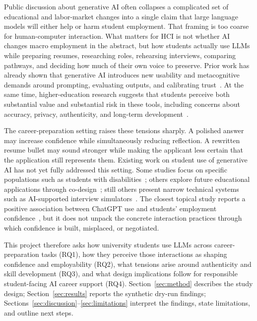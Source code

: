 \documentclass[sigconf,review,anonymous]{acmart}
\begin{document}
Public discussion about generative AI often collapses a complicated set of educational and labor-market changes into a single claim that large language models will either help or harm student employment. That framing is too coarse for human-computer interaction. What matters for HCI is not whether AI changes macro employment in the abstract, but how students actually use LLMs while preparing resumes, researching roles, rehearsing interviews, comparing pathways, and deciding how much of their own voice to preserve. Prior work has already shown that generative AI introduces new usability and metacognitive demands around prompting, evaluating outputs, and calibrating trust~\cite{tankelevitch2024metacognitive}. At the same time, higher-education research suggests that students perceive both substantial value and substantial risk in these tools, including concerns about accuracy, privacy, authenticity, and long-term development~\cite{chan2023studentsvoices,jochim2024teachingtesting}.

The career-preparation setting raises these tensions sharply. A polished answer may increase confidence while simultaneously reducing reflection. A rewritten resume bullet may sound stronger while making the applicant less certain that the application still represents them. Existing work on student use of generative AI has not yet fully addressed this setting. Some studies focus on specific populations such as students with disabilities~\cite{atcheson2025disabilitygenai}; others explore future educational applications through co-design~\cite{prasad2025multimodal}; still others present narrow technical systems such as AI-supported interview simulators~\cite{lee2024vrinterview}. The closest topical study reports a positive association between ChatGPT use and students' employment confidence~\cite{xiao2025employmentconfidence}, but it does not unpack the concrete interaction practices through which confidence is built, misplaced, or negotiated.

This project therefore asks how university students use LLMs across career-preparation tasks (RQ1), how they perceive those interactions as shaping confidence and employability (RQ2), what tensions arise around authenticity and skill development (RQ3), and what design implications follow for responsible student-facing AI career support (RQ4). Section~\ref{sec:method} describes the study design; Section~\ref{sec:results} reports the synthetic dry-run findings; Sections~\ref{sec:discussion}--\ref{sec:limitations} interpret the findings, state limitations, and outline next steps.
\end{document}
